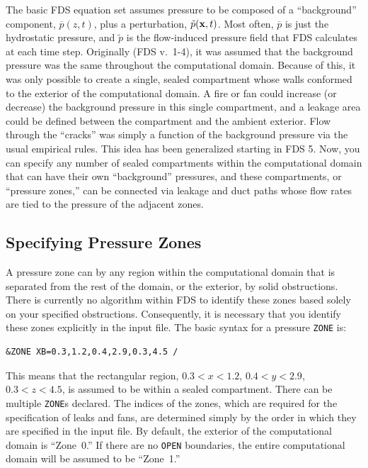 \documentclass[11pt]{book}
\newcommand{\ct}{\tt\small}
\newcommand{\bx}{{\bf x}}
\newcommand{\tp}{\tilde{p}}
\newcommand{\bp}{\overline{p}}
\begin{document}
The basic FDS equation set assumes pressure
to be composed of a ``background'' component, $\bp(z,t)$, plus a perturbation, $\tp(\bx,t)$. Most
often, $\bp$ is just the hydrostatic pressure, and $\tp$ is the flow-induced pressure field that
FDS calculates at each time step. Originally (FDS v.~1-4), it was assumed that the background pressure was the same throughout the computational domain.
Because of this, it was only possible to create a single, sealed
compartment whose walls conformed to the exterior of the computational domain. A fire or fan could
increase (or decrease) the background pressure in this single compartment, and a leakage area could
be defined between the compartment and the ambient exterior. Flow through the ``cracks'' was simply
a function of the background pressure via the usual empirical rules.
This idea has been generalized starting in FDS 5. Now, you can specify any number of sealed compartments within the computational
domain that can have their own ``background'' pressures, and these compartments, or ``pressure zones,'' can be connected via leakage and duct paths whose
flow rates are tied to the pressure of the adjacent zones.

\subsection{Specifying Pressure Zones}
\label{info:ZONE_Basics}

A pressure zone can by any region within the computational domain that is separated from the rest of the domain, or the exterior,
by solid obstructions. There is currently no algorithm within FDS to identify these zones based solely on your specified obstructions. Consequently, it is
necessary that you identify these zones explicitly in the input file. The basic syntax for a pressure {\ct ZONE} is:

\footnotesize
\begin{verbatim}
&ZONE XB=0.3,1.2,0.4,2.9,0.3,4.5 /
\end{verbatim}
\normalsize

\noindent
This means that the rectangular region, $0.3<x<1.2$, $0.4<y<2.9$, $0.3<z<4.5$, is assumed to be within a sealed compartment. There can be multiple {\ct ZONE}s
declared. The indices of the zones, which are required for the specification of leaks and fans, are determined simply by the order in which they are specified in the input file.
By default, the exterior of the computational
domain is ``Zone~0.'' If there are no {\ct OPEN} boundaries, the entire computational domain will be assumed to be ``Zone~1.''
\end{document}
